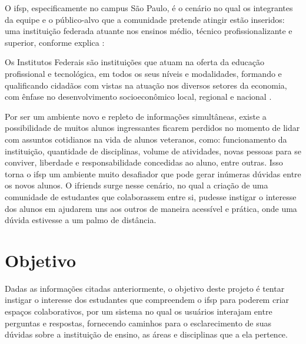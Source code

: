 O \ac{ifsp}, especificamente no campus São Paulo, é o cenário no qual os integrantes da equipe e o público-alvo que a comunidade pretende atingir estão inseridos: uma instituição federada atuante nos ensinos médio, técnico profissionalizante e superior, conforme explica : 

\begin{citacao}
Os Institutos Federais são instituições que atuam na oferta da educação profissional e tecnológica, em todos os seus níveis e modalidades, formando e qualificando cidadãos com vistas na atuação nos diversos setores da economia, com ênfase no desenvolvimento socioeconômico local, regional e nacional \cite{ifsmg}.
\end{citacao}

Por ser um ambiente novo e repleto de informações simultâneas, existe a possibilidade de muitos alunos ingressantes ficarem perdidos no momento de lidar com assuntos cotidianos na vida de alunos veteranos, como: funcionamento da instituição, quantidade de disciplinas, volume de atividades, novas pessoas para se conviver, liberdade e responsabilidade concedidas ao aluno, entre outras. Isso torna o \acs{ifsp} um ambiente muito desafiador que pode gerar inúmeras dúvidas entre os novos alunos. 
O \gls{ifriends} surge nesse cenário, no qual a criação de uma comunidade de estudantes que colaborassem entre si, pudesse instigar o interesse dos alunos em ajudarem uns aos outros de maneira acessível e prática, onde uma dúvida estivesse a um palmo de distância.


\section{Objetivo}

Dadas as informações citadas anteriormente, o objetivo deste projeto é tentar instigar o interesse dos estudantes que compreendem o \acs{ifsp} para poderem criar espaços colaborativos, por um sistema no qual os usuários interajam entre perguntas e respostas, fornecendo caminhos para o esclarecimento de suas dúvidas sobre a instituição de ensino, as áreas e disciplinas que a ela pertence.  

